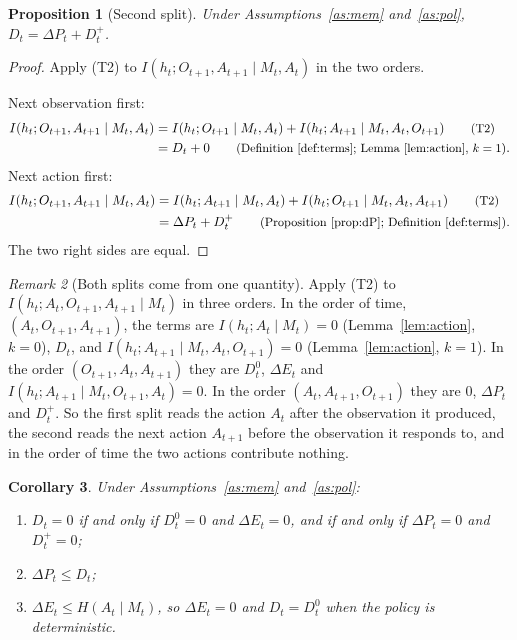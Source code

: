 \documentclass{article}
\newtheorem{proposition}{Proposition}[section]
\newtheorem{corollary}[proposition]{Corollary}
\theoremstyle{definition}
\theoremstyle{remark}
\newtheorem{remark}[proposition]{Remark}
\newcommand{\dE}{\Delta E}
\newcommand{\dP}{\Delta P}
\newcommand{\why}[1]{\tag*{\small(#1)}}
\begin{document}
\begin{proposition}[Second split]\label{prop:split2}
Under Assumptions~\ref{as:mem} and~\ref{as:pol}, $D_t=\dP_t+D^+_t$.
\end{proposition}

\begin{proof}
Apply (T2) to $I(h_t;O_{t+1},A_{t+1}\mid M_t,A_t)$ in the two orders.

Next observation first:
\begin{align*}
I(h_t;O_{t+1},A_{t+1}\mid M_t,A_t)&=I(h_t;O_{t+1}\mid M_t,A_t)+I(h_t;A_{t+1}\mid M_t,A_t,O_{t+1}) \why{T2}\\
&=D_t+0 \why{Definition~\ref{def:terms}; Lemma~\ref{lem:action}, $k=1$}.
\end{align*}
Next action first:
\begin{align*}
I(h_t;O_{t+1},A_{t+1}\mid M_t,A_t)&=I(h_t;A_{t+1}\mid M_t,A_t)+I(h_t;O_{t+1}\mid M_t,A_t,A_{t+1}) \why{T2}\\
&=\dP_t+D^+_t \why{Proposition~\ref{prop:dP}; Definition~\ref{def:terms}}.
\end{align*}
The two right sides are equal.
\end{proof}

\begin{remark}[Both splits come from one quantity]\label{rem:orders}
Apply (T2) to $I(h_t;A_t,O_{t+1},A_{t+1}\mid M_t)$ in three orders. In the order of time, $(A_t,O_{t+1},A_{t+1})$, the terms are $I(h_t;A_t\mid M_t)=0$ (Lemma~\ref{lem:action}, $k=0$), $D_t$, and $I(h_t;A_{t+1}\mid M_t,A_t,O_{t+1})=0$ (Lemma~\ref{lem:action}, $k=1$). In the order $(O_{t+1},A_t,A_{t+1})$ they are $D^0_t$, $\dE_t$ and $I(h_t;A_{t+1}\mid M_t,O_{t+1},A_t)=0$. In the order $(A_t,A_{t+1},O_{t+1})$ they are $0$, $\dP_t$ and $D^+_t$. So the first split reads the action $A_t$ after the observation it produced, the second reads the next action $A_{t+1}$ before the observation it responds to, and in the order of time the two actions contribute nothing.
\end{remark}

\begin{corollary}\label{cor:consequences}
Under Assumptions~\ref{as:mem} and~\ref{as:pol}:
\begin{enumerate}
\item[(a)] $D_t=0$ if and only if $D^0_t=0$ and $\dE_t=0$, and if and only if $\dP_t=0$ and $D^+_t=0$;
\item[(b)] $\dP_t\le D_t$;
\item[(c)] $\dE_t\le H(A_t\mid M_t)$, so $\dE_t=0$ and $D_t=D^0_t$ when the policy is deterministic.
\end{enumerate}
\end{corollary}
\end{document}

